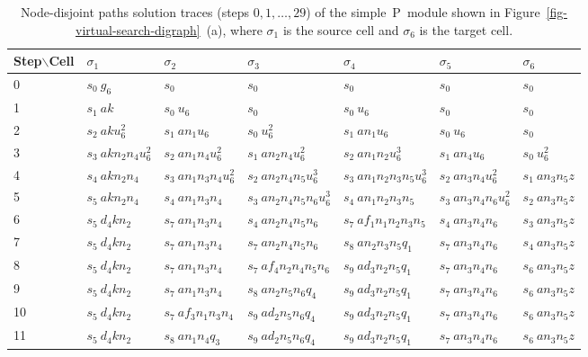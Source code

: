 \documentclass[preliminary,copyright,creativecommons]{eptcs}
\newcommand{\myway}[1]{\raisebox{-4pt}{\rule{0pt}{16pt}}\colorbox[rgb]{.7,.7,.7}{#1}}
\theoremstyle{remark}
\begin{document}
\begin{table}[h]
\caption{Node-disjoint paths solution traces (steps $0, 1, \ldots, 29$) of the 
simple~P~module shown in Figure~\ref{fig-virtual-search-digraph}~(a),
where $\sigma_1$ is the source cell and $\sigma_6$ is the target cell.}
\label{tab-trace-node}
\begin{center}
\renewcommand{\tabcolsep}{3.0pt}
\renewcommand{\arraystretch}{1.3}
\footnotesize
\noindent
\begin{tabular}{ | l | l | l | l | l | l | l | }
\hline
Step$\backslash$Cell
 & $\sigma_1$ & $\sigma_2$ & $\sigma_3$ & $\sigma_4$ & $\sigma_5$ & $\sigma_6$ \\ \hline
0 & $s_0~ g_6$ & $s_0~ $ & $s_0~ $ & $s_0~ $ & $s_0~ $ & $s_0~ $ \\ \hline
1 & $s_1~ ak$ & $s_0~ u_6$ & $s_0~ $ & $s_0~ u_6$ & $s_0~ $ & $s_0~ $ \\ \hline
2 & $s_2~ aku_6^{2}$ & $s_1~ an_1u_6$ & $s_0~ u_6^{2}$ & $s_1~ an_1u_6$ & $s_0~ u_6$ & $s_0~ $ \\ \hline
3 & $s_3~ akn_2n_4u_6^{2}$ & $s_2~ an_1n_4u_6^{2}$ & $s_1~ an_2n_4u_6^{2}$ & $s_2~ an_1n_2u_6^{3}$ & $s_1~ an_4u_6$ & $s_0~ u_6^{2}$ \\ \hline
4 & \myway{$s_4~ akn_2n_4$} & $s_3~ an_1n_3n_4u_6^{2}$ & $s_2~ an_2n_4n_5u_6^{3}$ & $s_3~ an_1n_2n_3n_5u_6^{3}$ & $s_2~ an_3n_4u_6^{2}$ & $s_1~ an_3n_5z$ \\ \hline
5 & $s_5~ akn_2n_4$ & \myway{$s_4~ an_1n_3n_4$} & $s_3~ an_2n_4n_5n_6u_6^{3}$ & \myway{$s_4~ an_1n_2n_3n_5$} & $s_3~ an_3n_4n_6u_6^{2}$ & $s_2~ an_3n_5z$ \\ \hline
6 & $s_5~ d_4kn_2$ & $s_7~ an_1n_3n_4$ & \myway{$s_4~ an_2n_4n_5n_6$} & $s_7~ af_1n_1n_2n_3n_5$ & \myway{$s_4~ an_3n_4n_6$} & $s_3~ an_3n_5z$ \\ \hline
7 & $s_5~ d_4kn_2$ & $s_7~ an_1n_3n_4$ & $s_7~ an_2n_4n_5n_6$ & $s_8~ an_2n_3n_5q_1$ & $s_7~ an_3n_4n_6$ & \myway{$s_4~ an_3n_5z$} \\ \hline
8 & $s_5~ d_4kn_2$ & $s_7~ an_1n_3n_4$ & $s_7~ af_4n_2n_4n_5n_6$ & $s_9~ ad_3n_2n_5q_1$ & $s_7~ an_3n_4n_6$ & $s_6~ an_3n_5z$ \\ \hline
9 & $s_5~ d_4kn_2$ & $s_7~ an_1n_3n_4$ & $s_8~ an_2n_5n_6q_4$ & $s_9~ ad_3n_2n_5q_1$ & $s_7~ an_3n_4n_6$ & $s_6~ an_3n_5z$ \\ \hline
10 & $s_5~ d_4kn_2$ & $s_7~ af_3n_1n_3n_4$ & $s_9~ ad_2n_5n_6q_4$ & $s_9~ ad_3n_2n_5q_1$ & $s_7~ an_3n_4n_6$ & $s_6~ an_3n_5z$ \\ \hline
11 & $s_5~ d_4kn_2$ & $s_8~ an_1n_4q_3$ & $s_9~ ad_2n_5n_6q_4$ & $s_9~ ad_3n_2n_5q_1$ & $s_7~ an_3n_4n_6$ & $s_6~ an_3n_5z$ \\ \hline

\end{tabular}
\end{center}
\end{table}
\end{document}
